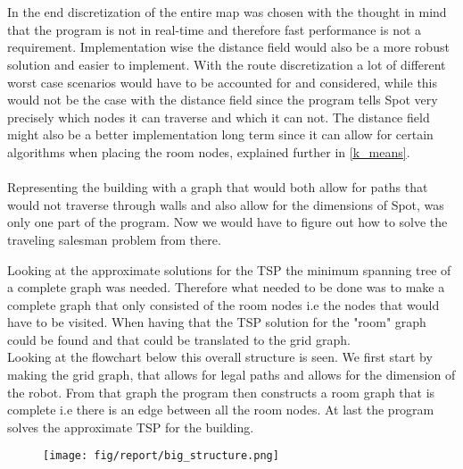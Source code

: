 
\\\\
In the end discretization of the entire map was chosen with the thought in mind that the program is not in real-time and therefore fast performance is not a requirement. Implementation wise the distance field would also be a more robust solution and easier to implement. With the route discretization a lot of different worst case scenarios would have to be accounted for and considered, while this would not be the case with the distance field since the program tells Spot very precisely which nodes it can traverse and which it can not. The distance field might also be a better implementation long term since it can allow for certain algorithms when placing the room nodes, explained further in \ref{k_means}.  
\\\\
Representing the building with a graph that would both allow for paths that would not traverse through walls and also allow for the dimensions of Spot, was only one part of the program. Now we would have to figure out how to solve the traveling salesman problem from there.

Looking at the approximate solutions for the TSP the minimum spanning tree of a complete graph was needed. 
Therefore what needed to be done was to make a complete graph that only consisted of the room nodes i.e the nodes that would have to be visited.  
When having that the TSP solution for the "room" graph could be found and that could be translated to the grid graph.
\\
Looking at the flowchart below this overall structure is seen. We first start by making the grid graph, that allows for legal paths and allows for the dimension of the robot. From that graph the program then constructs a room graph that is complete i.e there is an edge between all the room nodes. At last the program solves the approximate TSP for the building.

\begin{figure}[H]
    \centering
    \texttt{[image: fig/report/big\_structure.png]}
    \label{}
    \caption[Design overview]{}
\end{figure}




